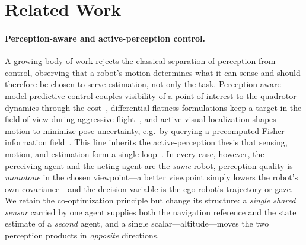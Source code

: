 
\section{Related Work}
\label{sec:related}

\paragraph*{Perception-aware and active-perception control.}
A growing body of work rejects the classical separation of perception from control,
observing that a robot's motion determines what it can sense and should therefore be
chosen to serve estimation, not only the task. Perception-aware model-predictive
control couples visibility of a point of interest to the quadrotor dynamics through the
cost~\cite{falanga2018pampc}, differential-flatness formulations keep a target in the
field of view during aggressive flight~\cite{spasojevic2020perception}, and active
visual localization shapes motion to minimize pose uncertainty, e.g.\ by querying a
precomputed Fisher-information field~\cite{zhang2019fisher}. This line inherits the
active-perception thesis that sensing, motion, and estimation form a single
loop~\cite{cadena2016past,placed2023survey}. In every case, however, the perceiving
agent and the acting agent are the \emph{same} robot, perception quality is
\emph{monotone} in the chosen viewpoint---a better viewpoint simply lowers the robot's
own covariance---and the decision variable is the ego-robot's trajectory or gaze. We
retain the co-optimization principle but change its structure: a \emph{single shared
sensor} carried by one agent supplies both the navigation reference and the state
estimate of a \emph{second} agent, and a single scalar---altitude---moves the two
perception products in \emph{opposite} directions.

